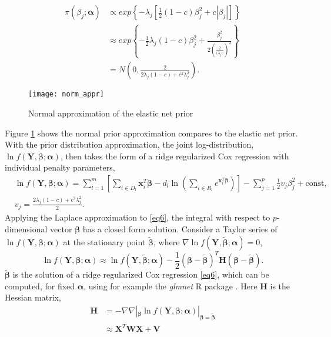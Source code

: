 \begin{equation} \label{eq5}
\begin{aligned}
    \pi(\beta_j; \bm{\alpha}) &\propto exp\left\{ -\lambda_j\left[\frac{1}{2}(1-c)\beta_j^2 + c|\beta_j|\right] \right\} \\
    &\approx exp\left\{ -\frac{1}{2}\lambda_j(1-c)\beta_j^2 + \frac{\beta_j^2}{2(\frac{2}{(\lambda_jc})^2} \right\} \\
    &= N \left( 0, \frac{2}{2\lambda_j(1-c)+c^2\lambda_j^2} \right). 
\end{aligned}
\end{equation}
\begin{figure}[tbh]
  \centering
  \texttt{[image: norm\_appr]}
  \caption{Normal approximation of the elastic net prior}
  \label{fig:norm_appr}
\end{figure}
Figure \ref{fig:norm_appr} shows the normal prior approximation compares to the elastic net prior. With the prior distribution approximation, the joint log-distribution, $\ln f(\bm{Y}, \bm{\beta};\bm{\alpha})$, then takes the form of a ridge regularized Cox regression with individual penalty parameters,
\begin{equation} \label{eq6}
\begin{aligned}
    &\ln f(\bm{Y}, \bm{\beta};\bm{\alpha}) = \sum_{l=1}^{m}\left[\sum_{i\in D_l}\bm{x}_i^T\bm{\beta}-d_l\ln(\sum_{i\in R_l} e^{\bm{x}_i^T\bm{\beta}})\right] - \sum_{j=1}^{p} \frac{1}{2}v_j\beta_j^2 + \text{const}, \\
    &v_j = \frac{2\lambda_j(1-c)+c^2\lambda_j^2}{2}.
\end{aligned}
\end{equation}
Applying the Laplace approximation \citep{laplace1986memoir} to \eqref{eq6}, the integral with respect to $p$-dimensional vector $\bm{\beta}$ has a closed form solution. Consider a Taylor series of $\ln f(\bm{Y}, \bm{\beta};\bm{\alpha})$ at the stationary point $\tilde{\bm{\beta}}$, where $\nabla \ln f(\bm{Y}, \tilde{\bm{\beta}};\bm{\alpha})=0$,
$$ \ln f(\bm{Y}, \bm{\beta};\bm{\alpha}) \approx \ln f(\bm{Y}, \tilde{\bm{\beta}};\bm{\alpha}) - \frac{1}{2}(\bm{\beta}-\tilde{\bm{\beta}})^T\bm{H}(\bm{\beta}-\tilde{\bm{\beta}}). $$
$\tilde{\bm{\beta}}$ is the solution of a ridge regularized Cox regression \eqref{eq6}, which can be computed, for fixed $\bm{\alpha}$,  using for example the  \emph{glmnet} R package \citep{simon2011regularization}. Here $\bm{H}$ is the Hessian matrix,
\begin{align*}
    \bm{H} &= - \nabla\nabla|_{\bm{\beta}} \ln f(\bm{Y}, \bm{\beta};\bm{\alpha})|_{\bm{\beta}=\tilde{\bm{\beta}}} \\
    & \approx \bm{X}^T\bm{W}\bm{X} + \bm{V}
\end{align*}
